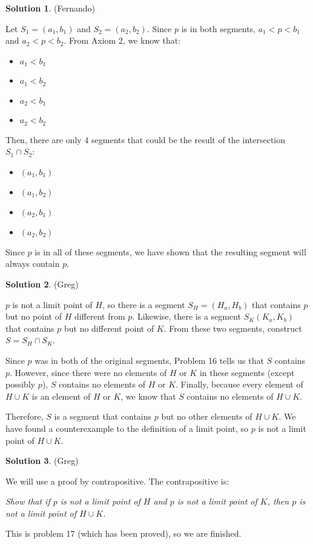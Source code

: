 \documentclass{article}
\theoremstyle{definition}
\newtheorem{solution}{Solution}
\begin{document}
\begin{solution} %
(Fernando)

Let $S_1 = (a_1, b_1)$ and $S_2 = (a_2, b_2)$.
Since $p$ is in both segments, $a_1 < p < b_1$ and $a_2 < p < b_2$.
From Axiom 2, we know that:

\begin{itemize}
\item $a_1 < b_1$
\item $a_1 < b_2$
\item $a_2 < b_1$
\item $a_2 < b_2$
\end{itemize}

Then, there are only 4 segments that could be the result of the intersection $S_1 \cap S_2$:

\begin{itemize}
\item $(a_1, b_1)$
\item $(a_1, b_2)$
\item $(a_2, b_1)$
\item $(a_2, b_2)$
\end{itemize}

Since $p$ is in all of these segments, we have shown that the resulting segment will always contain $p$.
\end{solution}

\begin{solution} %
(Greg)

$p$ is not a limit point of $H$, so there is a segment $S_H = (H_a, H_b)$ that contains $p$ but no point of $H$ different from $p$.
Likewise, there is a segment $S_K (K_a, K_b)$ that contains $p$ but no different point of $K$.
From these two segments, construct $S = S_H \cap S_K$. 

Since $p$ was in both of the original segments, Problem 16 tells us that $S$ contains $p$.
However, since there were no elements of $H$ or $K$ in these segments (except possibly $p$), $S$ contains no elements of $H$ or $K$.
Finally, because every element of $H \cup K$ is an element of $H$ or $K$, we know that $S$ contains no elements of $H \cup K$.

Therefore, $S$ is a segment that contains $p$ but no other elements of $H \cup K$.
We have found a counterexample to the definition of a limit point, so $p$ is not a limit point of $H \cup K$.
\end{solution}

\begin{solution} %
(Greg)

We will use a proof by contrapositive. The contrapositive is:

\textit{Show that if $p$ is not a limit point of $H$ and $p$ is not a limit point of $K$, then $p$ is not a limit point of $H \cup K$.}

This is problem 17 (which has been proved), so we are finished.
\end{solution}
\end{document}
